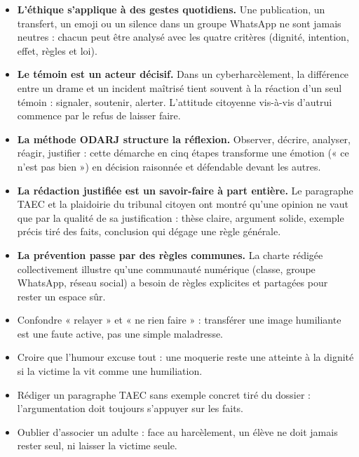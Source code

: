 \documentclass[11pt]{article}
\begin{document}
\begin{itemize}
\item \textbf{L'éthique s'applique à des gestes quotidiens.} Une publication, un transfert, un emoji ou un silence dans un groupe WhatsApp ne sont jamais neutres : chacun peut être analysé avec les quatre critères (dignité, intention, effet, règles et loi).
\item \textbf{Le témoin est un acteur décisif.} Dans un cyberharcèlement, la différence entre un drame et un incident maîtrisé tient souvent à la réaction d'un seul témoin : signaler, soutenir, alerter. L'attitude citoyenne vis-à-vis d'autrui commence par le refus de laisser faire.
\item \textbf{La méthode ODARJ structure la réflexion.} Observer, décrire, analyser, réagir, justifier : cette démarche en cinq étapes transforme une émotion (« ce n'est pas bien ») en décision raisonnée et défendable devant les autres.
\item \textbf{La rédaction justifiée est un savoir-faire à part entière.} Le paragraphe TAEC et la plaidoirie du tribunal citoyen ont montré qu'une opinion ne vaut que par la qualité de sa justification : thèse claire, argument solide, exemple précis tiré des faits, conclusion qui dégage une règle générale.
\item \textbf{La prévention passe par des règles communes.} La charte rédigée collectivement illustre qu'une communauté numérique (classe, groupe WhatsApp, réseau social) a besoin de règles explicites et partagées pour rester un espace sûr.
\end{itemize}

\begin{attention}
\begin{itemize}
\item Confondre « relayer » et « ne rien faire » : transférer une image humiliante est une faute active, pas une simple maladresse.
\item Croire que l'humour excuse tout : une moquerie reste une atteinte à la dignité si la victime la vit comme une humiliation.
\item Rédiger un paragraphe TAEC sans exemple concret tiré du dossier : l'argumentation doit toujours s'appuyer sur les faits.
\item Oublier d'associer un adulte : face au harcèlement, un élève ne doit jamais rester seul, ni laisser la victime seule.
\end{itemize}
\end{attention}
\end{document}
